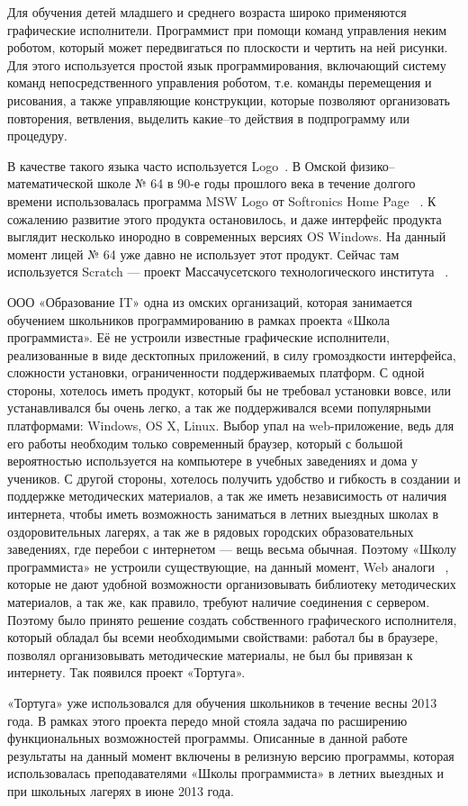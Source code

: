 Для обучения детей младшего и среднего возраста широко применяются графические исполнители. Программист при помощи команд управления неким роботом, который может передвигаться по плоскости и чертить на ней рисунки. Для этого используется простой язык программирования, включающий систему команд непосредственного управления роботом, т.е. команды перемещения и рисования, а также управляющие конструкции, которые позволяют организовать повторения, ветвления, выделить какие–то действия в подпрограмму или процедуру.\par
В качестве такого языка часто используется Logo~\cite{shaposhnicow}. В Омской физико–математической школе № 64 в 90-е годы прошлого века в течение долгого времени использовалась программа MSW Logo от Softronics Home Page ~\cite{logo}. К сожалению развитие этого продукта остановилось, и даже интерфейс продукта выглядит несколько инородно в современных версиях OS Windows. На данный момент лицей № 64 уже давно не использует этот продукт. Сейчас там используется Scratch --- проект Массачусетского технологического института ~\cite{scratch}.\par
ООО «Образование IT» одна из омских организаций, которая занимается обучением школьников программированию в рамках проекта «Школа программиста». Её не устроили известные графические исполнители, реализованные в виде десктопных приложений, в силу громоздкости интерфейса, сложности установки, ограниченности поддерживаемых платформ. С одной стороны, хотелось иметь продукт, который бы не требовал установки вовсе, или устанавливался бы очень легко, а так же поддерживался всеми популярными платформами: Windows, OS X, Linux. Выбор упал на web-приложение, ведь для его работы необходим только современный браузер, который с большой вероятностью используется на компьютере в учебных заведениях и дома у учеников. С другой стороны, хотелось получить удобство и гибкость в создании и поддержке методических материалов, а так же иметь независимость от наличия интернета, чтобы иметь возможность заниматься в летних выездных школах в оздоровительных лагерях, а так же в рядовых городских образовательных заведениях, где перебои с интернетом --- вещь весьма обычная. Поэтому «Школу программиста» не устроили существующие, на данный момент, Web аналоги ~\cite{blockly,codecademy,kodu,appinventor,alice,onlibelogo,logointerpr,logotortoise,tortuelogo,papert,}, которые не дают удобной возможности организовывать библиотеку методических материалов, а так же, как правило, требуют наличие соединения с сервером. Поэтому было принято решение создать собственного графического исполнителя, который обладал бы всеми необходимыми свойствами: работал бы в браузере, позволял организовывать методические материалы, не был бы привязан к интернету. Так появился проект «Тортуга».\par
«Тортуга» уже использовался для обучения школьников в течение весны 2013 года. В рамках этого проекта передо мной стояла задача по расширению функциональных возможностей программы. Описанные в данной работе результаты на данный момент включены в релизную версию программы, которая использовалась преподавателями «Школы программиста» в летних выездных и при школьных лагерях в июне 2013 года.


\clearpage